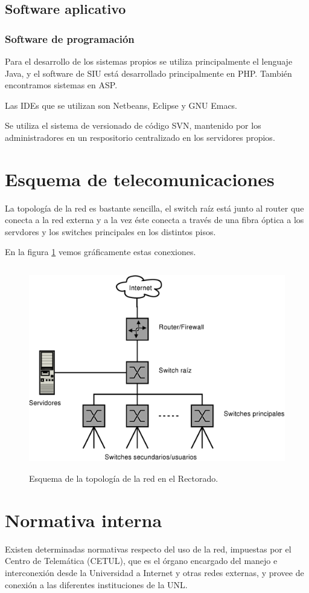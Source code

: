 \documentclass[a4paper,11pt,oneside]{article}
\begin{document}
\subsection*{Software aplicativo}
%
\subsubsection*{Software de programación}
%
Para el desarrollo de los sistemas propios se utiliza principalmente
el lenguaje Java, y el software de SIU está desarrollado
principalmente en PHP. También encontramos sistemas en ASP.

Las IDEs que se utilizan son Netbeans, Eclipse y GNU Emacs.

Se utiliza el sistema de versionado de código SVN, mantenido por los
administradores en un respositorio centralizado en los servidores
propios.
%
\section{Esquema de telecomunicaciones}
La topología de la red es bastante sencilla, el switch raíz está junto
al router que conecta a la red externa y a la vez éste conecta a
través de una fibra óptica a los servdores y los switches principales
en los distintos pisos.

En la figura \ref{topologia} vemos gráficamente estas conexiones.
%
\begin{figure}
  \center\includegraphics[height=89mm]{img/red}
  \caption{Esquema de la topología de la red en el Rectorado.}
  \label{topologia}
\end{figure}
\section{Normativa interna}
%
Existen determinadas normativas respecto del uso de la red, impuestas
por el Centro de Telemática (CETUL), que es el órgano encargado del
manejo e interconexión desde la Universidad a Internet y otras redes
externas, y provee de conexión a las diferentes instituciones de la
UNL.
\end{document}
